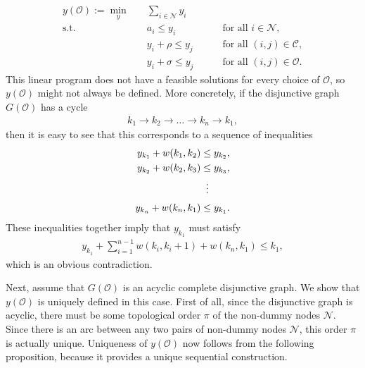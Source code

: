 \documentclass[a4paper]{report}
\theoremstyle{definition}
\theoremstyle{plain}
\begin{document}
\begin{subequations}\label{eq:active_schedule}
\begin{alignat}{3}
  y(\mathcal{O}) :=
  \min_{y} \quad & \sum_{i \in \mathcal{N}} y_{i} \\
  \text{s.t.} \quad & a_{i} \leq y_{i} && \quad \text{ for all } i \in \mathcal{N}, \\
           & y_{i} + \rho \leq y_{j} && \quad \text{ for all } (i,j) \in \mathcal{C}, \\
           & y_{i} + \sigma \leq y_{j} && \quad \text{ for all } (i,j) \in \mathcal{O} .
\end{alignat}
\end{subequations}
%
This linear program does not have a feasible solutions for every choice of
$\mathcal{O}$, so $y(\mathcal{O})$ might not always be defined.
%
More concretely, if the disjunctive graph $G(\mathcal{O})$ has a cycle
\begin{align*}
 k_1 \rightarrow k_2 \rightarrow \dots \rightarrow k_n \rightarrow k_1,
\end{align*}
%
then it is easy to see that this corresponds to a sequence of inequalities
\begin{align*}
  y_{k_1} + w(k_1,k_2) &\leq y_{k_2} ,\\
  y_{k_2} + w(k_2,k_3) &\leq y_{k_3} ,\\
  &\vdotswithin{=} \notag \\[0.3em]
  y_{k_n} + w(k_n,k_1) &\leq y_{k_1} .
\end{align*}
%
These inequalities together imply that $y_{k_1}$ must satisfy
\begin{align}
  y_{k_1} + \sum_{i=1}^{n-1} w(k_i, k_i+1) + w(k_n, k_1) \leq k_1 ,
\end{align}
which is an obvious contradiction.

Next, assume that $G(\mathcal{O})$ is an acyclic complete disjunctive graph.
We show that $y(\mathcal{O})$ is uniquely defined in this case.
%
First of all, since the disjunctive graph is acyclic, there must be some
topological order $\pi$ of the non-dummy nodes $\mathcal{N}$.
%
Since there is an arc between any two pairs of non-dummy nodes $\mathcal{N}$,
this order $\pi$ is actually unique.
%
Uniqueness of $y(\mathcal{O})$ now follows from the following proposition,
because it provides a unique sequential construction.
\end{document}
